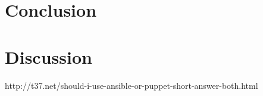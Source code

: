 \section{Conclusion}\label{sec:conclusion}

\section{Discussion}\label{sec:discussion}
http://t37.net/should-i-use-ansible-or-puppet-short-answer-both.html
